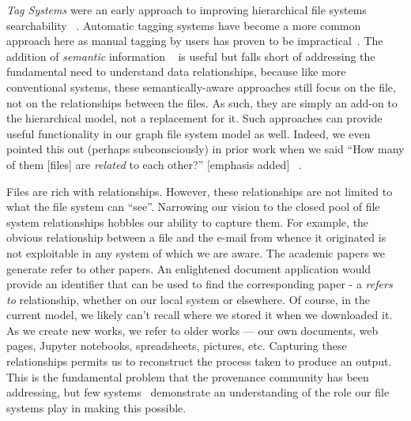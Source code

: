 \textit{Tag Systems} were an early approach to improving hierarchical file systems searchability%
~\cite{Parker-Wood2014,chou2015findfs,ma2009file,laursen2014,nayuki2017,Andrews2012,Up2016,Jones2016,aws:s3:object:tagging,ames2006lifs,leung2009magellan,frieder2012hierarchical}.
Automatic tagging systems have become a more common approach here as manual tagging by users
has proven to be impractical~\cite{soules2003can,soules2004toward}.
The addition of \textit{semantic} information
~\cite{di2017gfs,hua2016real,martin2004formal,Martin2005,martin2008,martin2014,gifford1991semantic,Faubel2008,harlan2011joinfs,Suguna2015,Andrews2012,ngo2007integrating,Omvlee2009,wang2003managing,gopal1999integrating,Codocedo2015,Jones2016,Mahalingam2003,Parker-Wood2014}
is useful but falls short of addressing the fundamental need to understand
data relationships, because like more conventional systems,
these semantically-aware approaches still focus on the file,
not on the relationships between the files.
As such, they are simply an add-on to
the hierarchical model, not a replacement for it.
Such approaches can provide useful functionality
in our graph file system model as well.
Indeed, we even pointed this out (perhaps subconsciously) in prior
work when we said ``How many of them [files] are \textit{related} to
each other?'' [emphasis added]~\cite{Seltzer2009} .

Files are rich with relationships.  However, these relationships are not limited to what the
file system can ``see''.
Narrowing our vision to the closed pool of file system relationships
hobbles our ability to capture them.
For example, the obvious relationship between
a file and the e-mail from whence it originated is not exploitable in
any system of which we are aware.
The academic papers we generate refer to other papers.  An enlightened document application would provide an identifier that can
be used to find the corresponding paper - a \textit{refers to} relationship,
whether on our local system or elsewhere.
Of course, in the current model, we likely can't
recall where we stored it when we downloaded it.  As we create new works, we refer to older works --- our own
documents, web pages, Jupyter notebooks, spreadsheets, pictures, etc. Capturing these relationships permits
us to reconstruct the process taken to produce an output.
This is the fundamental problem that the provenance community has been
addressing, but few systems~\cite{pasquier17camflow,reddy06pass} demonstrate
an understanding of the role our file systems play in making this
possible.

